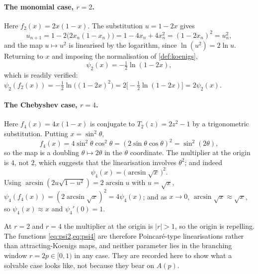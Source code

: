 \paragraph{The monomial case, $r=2$.}
Here $f_2(x) = 2x(1-x)$. The substitution $u = 1-2x$ gives
\begin{equation*}
u_{n+1} = 1 - 2\bigl(2x_n(1-x_n)\bigr) = 1-4x_n+4x_n^2 = (1-2x_n)^2 = u_n^2 ,
\end{equation*}
and the map $u\mapsto u^2$ is linearised by the logarithm, since
$\ln(u^2) = 2\ln u$. Returning to $x$ and imposing the normalisation of
\cref{def:koenigs},
\begin{equation}
\label{eq:psi2}
\psi_2(x) = -\tfrac12\ln(1-2x),
\end{equation}
which is readily verified:
$\psi_2(f_2(x)) = -\tfrac12\ln\bigl((1-2x)^2\bigr) = 2\bigl[-\tfrac12\ln(1-2x)\bigr] = 2\psi_2(x)$.

\paragraph{The Chebyshev case, $r=4$.}
Here $f_4(x) = 4x(1-x)$ is conjugate to $T_2(z) = 2z^2-1$ by a trigonometric
substitution. Putting $x = \sin^2\theta$,
\begin{equation*}
f_4(x) = 4\sin^2\theta\cos^2\theta = (2\sin\theta\cos\theta)^2 = \sin^2(2\theta),
\end{equation*}
so the map is a doubling $\theta\mapsto2\theta$ in the $\theta$ coordinate. The
multiplier at the origin is $4$, not $2$, which suggests that the linearisation involves
$\theta^2$; and indeed
\begin{equation}
\label{eq:psi4}
\psi_4(x) = \bigl(\arcsin\sqrt{x}\,\bigr)^2 .
\end{equation}
Using $\arcsin(2u\sqrt{1-u^2}) = 2\arcsin u$ with $u=\sqrt{x}$,
$\psi_4(f_4(x)) = (2\arcsin\sqrt{x})^2 = 4\psi_4(x)$; and as $x\to0$,
$\arcsin\sqrt{x}\approx\sqrt{x}$, so $\psi_4(x)\approx x$ and $\psi_4'(0)=1$.

\begin{remark}
\label{rem:attractrepel}
At $r=2$ and $r=4$ the multiplier at the origin is $|r|>1$, so the origin is repelling.
The functions \cref{eq:psi2,eq:psi4} are therefore Poincar\'e-type linearisations rather
than attracting-Koenigs maps, and neither parameter lies in the branching window
$r=2p\in[0,1)$ in any case. They are recorded here to show what a solvable case looks
like, not because they bear on $A(p)$.
\end{remark}


